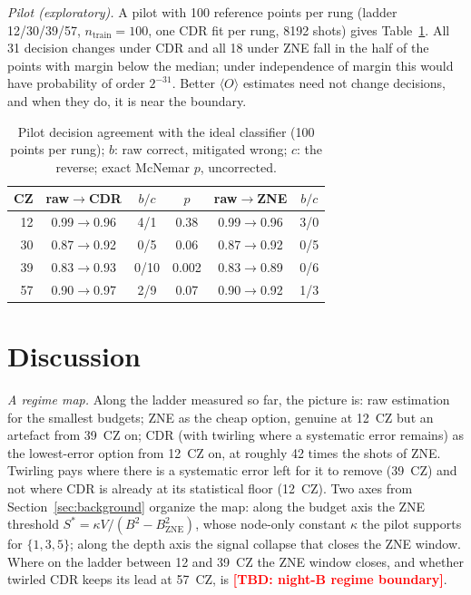 \documentclass[conference]{IEEEtran}
\newcommand{\TBD}[1]{\textcolor{red}{\textbf{[TBD: #1]}}}
\newcommand{\ev}[1]{\langle #1\rangle}
\begin{document}
\emph{Pilot (exploratory).} A pilot with 100 reference points per rung (ladder 12/30/39/57,
$n_{\text{train}}=100$, one CDR fit per rung, 8192 shots) gives Table~\ref{tab:dec}. All 31
decision changes under CDR and all 18 under ZNE fall in the half of the points with margin
below the median; under independence of margin this would have probability of order
$2^{-31}$. Better $\ev{O}$ estimates need not change decisions, and when they do, it is near
the boundary.

\begin{table}[t]
\caption{Pilot decision agreement with the ideal classifier (100 points per rung); $b$:
raw correct, mitigated wrong; $c$: the reverse; exact McNemar $p$, uncorrected.}
\label{tab:dec}
\centering\footnotesize
\begin{tabular}{@{}rccccc@{}}
\toprule
CZ & raw$\to$CDR & $b/c$ & $p$ & raw$\to$ZNE & $b/c$ \\
\midrule
12 & 0.99$\to$0.96 & 4/1 & 0.38 & 0.99$\to$0.96 & 3/0 \\
30 & 0.87$\to$0.92 & 0/5 & 0.06 & 0.87$\to$0.92 & 0/5 \\
39 & 0.83$\to$0.93 & 0/10 & 0.002 & 0.83$\to$0.89 & 0/6 \\
57 & 0.90$\to$0.97 & 2/9 & 0.07 & 0.90$\to$0.92 & 1/3 \\
\bottomrule
\end{tabular}
\end{table}

\section{Discussion}\label{sec:discussion}

\emph{A regime map.} Along the ladder measured so far, the picture is: raw estimation for the
smallest budgets; ZNE as the cheap option, genuine at 12~CZ but an artefact from 39~CZ on; CDR
(with twirling where a systematic error remains) as the lowest-error option from 12~CZ on, at roughly 42 times the shots of ZNE.
Twirling pays where there is a systematic error left for it to remove (39~CZ) and not where CDR
is already at its statistical floor (12~CZ). Two axes from Section~\ref{sec:background} organize
the map: along the budget axis the ZNE threshold $S^\ast=\kappa V/(B^2-B^2_{\text{ZNE}})$, whose
node-only constant $\kappa$ the pilot supports for $\{1,3,5\}$; along the depth axis the signal
collapse that closes the ZNE window. Where on the ladder between 12 and 39~CZ the ZNE window
closes, and whether twirled CDR keeps its lead at 57~CZ, is \TBD{night-B regime boundary}.
\end{document}
